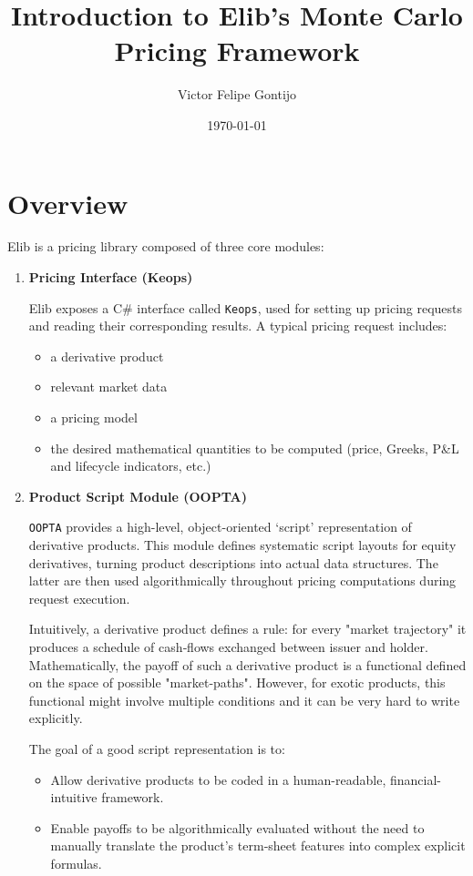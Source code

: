\documentclass[11pt]{article}
\title{Introduction to Elib's Monte Carlo Pricing Framework}
\author{Victor Felipe Gontijo}
\date{\today}
\begin{document}
\maketitle



\section{Overview}

Elib is a pricing library composed of three core modules:

\begin{enumerate}
  \item \textbf{Pricing Interface (Keops)}
  
    Elib exposes a C\# interface called \texttt{Keops}, used for setting up pricing requests and reading their corresponding results. A typical pricing request includes:
    \begin{itemize}
      \item a derivative product
      \item relevant market data
      \item a pricing model
      \item the desired mathematical quantities to be computed (price, Greeks, P\&L and lifecycle indicators, etc.)
    \end{itemize}

  \item \textbf{Product Script Module (OOPTA)}

    \texttt{OOPTA} provides a high-level, object-oriented ‘script’ representation of derivative products. This module defines systematic script layouts for equity derivatives, turning product descriptions into actual data structures. The latter are then used algorithmically throughout pricing computations during request execution.

    Intuitively, a derivative product defines a rule: for every "market trajectory" it produces a schedule of cash‐flows exchanged between issuer and holder.  
    Mathematically, the payoff of such a derivative product is a functional defined on the space of possible "market-paths". However, for exotic products, this functional might involve multiple conditions and it can be very hard to write explicitly.  
    
    The goal of a good script representation is to:
    \begin{itemize}
        \item Allow derivative products to be coded in a human-readable, financial-intuitive framework.
         \item Enable payoffs to be algorithmically evaluated without the need to manually translate the product’s term‐sheet features into complex explicit formulas.
    \end{itemize}
      

\end{enumerate}
\end{document}
